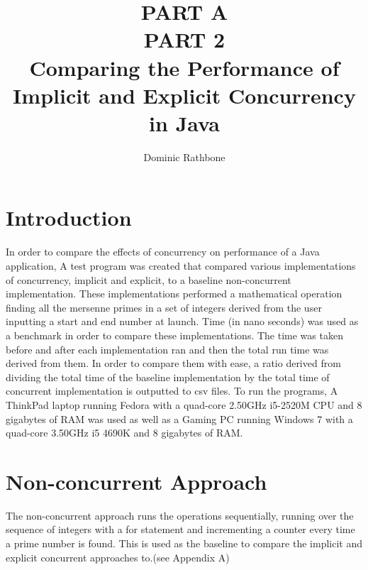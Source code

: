 \documentclass[]{report}
\title{PART A \\ PART 2 \\ Comparing the Performance of Implicit and Explicit Concurrency in Java}
\author{Dominic Rathbone}
\begin{document}
\maketitle

\section*{Introduction}
In order to compare the effects of concurrency on performance of a Java application, A test program was created that compared various implementations of concurrency, implicit and explicit, to a baseline non-concurrent implementation. These implementations performed a mathematical operation finding all the mersenne primes in a set of integers derived from the user inputting a start and end number at launch. Time (in nano seconds) was used as a benchmark in order to compare these implementations. The time was taken before and after each implementation ran and then the total run time was derived from them. In order to compare them with ease, a ratio derived from dividing the total time of the baseline implementation by the total time of concurrent implementation is outputted to csv files. To run the programs, A ThinkPad laptop running Fedora with a quad-core 2.50GHz i5-2520M CPU and 8 gigabytes of RAM was used as well as a Gaming PC running Windows 7 with a quad-core 3.50GHz i5 4690K and 8 gigabytes of RAM.

\section{Non-concurrent Approach}
The non-concurrent approach runs the operations sequentially, running over the sequence of integers with a for statement and incrementing a counter every time a prime number is found. This is used as the baseline to compare the implicit and explicit concurrent approaches to.(see Appendix A)
\end{document}
